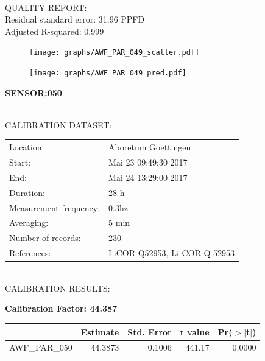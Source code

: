 \documentclass[oneside]{report}
\begin{document}
\hrulefill\\
QUALITY REPORT:\\
Residual standard error: 31.96 PPFD\\
Adjusted R-squared: 0.999



\begin{figure}[H]
  \centering
  \texttt{[image: graphs/AWF\_PAR\_049\_scatter.pdf]}
\end{figure}




\begin{figure}[H]
  \centering
  \texttt{[image: graphs/AWF\_PAR\_049\_pred.pdf]}
\end{figure}

\pagebreak


\begin{center}
\large{\textbf{SENSOR:050}}\\
\end{center}

\hrulefill\\
CALIBRATION DATASET:\\
\begin{table}[h!]
  \centering
  \label{tab:table1}
  \begin{tabular}{ll}
    Location: & Aboretum Goettingen\\ 
    
    
    Start:  & Mai 23 09:49:30 2017 \\
    End:   & Mai 24 13:29:00 2017\\ 
    Duration: & 28 h\\
    Measurement frequency: & 0.3hz\\
    Averaging:  &5 min\\
    Number of records: & 230 \\
    References: & LiCOR Q52953, Li-COR Q 52953 \\
  \end{tabular}
\end{table}

\hrulefill\\
CALIBRATION RESULTS:\\


\begin{center}
\textbf{\large{Calibration Factor: 44.387}}\\
\end{center}
\begin{table}[ht]
\centering
\begin{tabular}{rrrrr}
  \hline
 & Estimate & Std. Error & t value & Pr($>$$|$t$|$) \\ 
  \hline
AWF\_PAR\_050 & 44.3873 & 0.1006 & 441.17 & 0.0000 \\ 
   \hline
\end{tabular}
\end{table}
\end{document}
